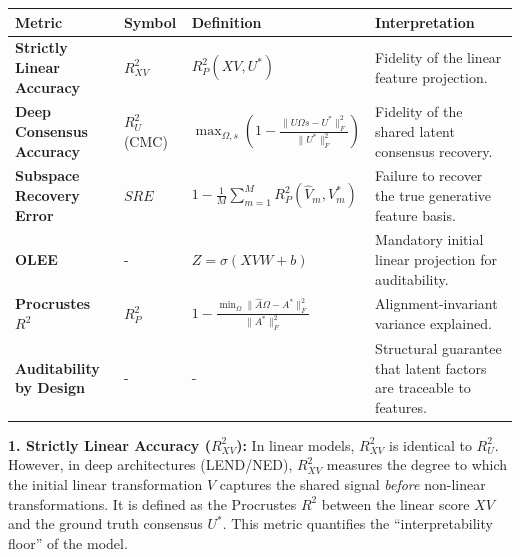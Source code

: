 \documentclass[
  letterpaper,
]{report}
\newcounter{none} %
\begin{document}
{\def\LTcaptype{none} %
\begin{longtable}[]{@{}
  >{\raggedright\arraybackslash}p{}
  >{\centering\arraybackslash}p{}
  >{\raggedright\arraybackslash}p{}
  >{\raggedright\arraybackslash}p{}@{}}
\toprule\noalign{}
\begin{minipage}[b]{\linewidth}\raggedright
Metric
\end{minipage} & \begin{minipage}[b]{\linewidth}\centering
Symbol
\end{minipage} & \begin{minipage}[b]{\linewidth}\raggedright
Definition
\end{minipage} & \begin{minipage}[b]{\linewidth}\raggedright
Interpretation
\end{minipage} \\
\midrule\noalign{}
\endhead
\bottomrule\noalign{}
\endlastfoot
\textbf{Strictly Linear Accuracy} & \(R^2_{XV}\) & \(R^2_P(X V, U^*)\) &
Fidelity of the linear feature projection. \\
\textbf{Deep Consensus Accuracy} & \(R^2_U\) (CMC) &
\(\max_{\Omega, s} \left( 1 - \frac{\|\hat{U}\Omega s - U^*\|_F^2}{\|U^*\|_F^2} \right)\)
& Fidelity of the shared latent consensus recovery. \\
\textbf{Subspace Recovery Error} & \(SRE\) &
\(1 - \frac{1}{M} \sum_{m=1}^M R^2_P(\hat{V}_m, V^*_m)\) & Failure to
recover the true generative feature basis. \\
\textbf{OLEE} & - & \(Z = \sigma(X V W + b)\) & Mandatory initial linear
projection for auditability. \\
\textbf{Procrustes \(R^2\)} & \(R^2_P\) &
\(1 - \frac{\min_{\Omega} \|\hat{A}\Omega - A^*\|_F^2}{\|A^*\|_F^2}\) &
Alignment-invariant variance explained. \\
\textbf{Auditability by Design} & - & - & Structural guarantee that
latent factors are traceable to features. \\
\end{longtable}
}

\textbf{1. Strictly Linear Accuracy (\(R^2_{XV}\)):} In linear models,
\(R^2_{XV}\) is identical to \(R^2_U\). However, in deep architectures
(LEND/NED), \(R^2_{XV}\) measures the degree to which the initial linear
transformation \(V\) captures the shared signal \emph{before} non-linear
transformations. It is defined as the Procrustes \(R^2\) between the
linear score \(XV\) and the ground truth consensus \(U^*\). This metric
quantifies the ``interpretability floor'' of the model.
\end{document}
